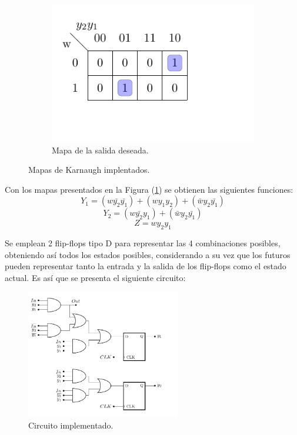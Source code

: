 \begin{figure}[H]
\begin{subfigure}{0.45\textwidth}
\end{subfigure}
\begin{subfigure}{0.5\textwidth}
	\centering
	\includegraphics[width=\textwidth, page=3]{ImagenesEjercicio2/Mapas-Kar.pdf}
	\caption{Mapa de la salida deseada.}
\end{subfigure}
	\caption{Mapas de Karnaugh implentados.}
	\label{fig:karnmealy}
\end{figure}

Con los mapas presentados en la Figura (\ref{fig:karnmealy}) se obtienen las siguientes funciones:
\begin{equation*}
	Y_1=(w\bar{y_2}\bar{y_1})+(wy_1y_2)+(\bar{w}y_2\bar{y_1})
\end{equation*}
\begin{equation*}
	Y_2=(w\bar{y_2}y_1)+(\bar{w}y_2\bar{y_1})
\end{equation*}
\begin{equation*}
	Z=wy_2y_1
\end{equation*}

Se emplean 2 flip-flops tipo D para representar las 4 combinaciones posibles, obteniendo así todos los estados posibles, considerando a su vez que los futuros pueden representar tanto la entrada y la salida de los flip-flops como el estado actual. Es así que se presenta el siguiente circuito:
\begin{figure}[H]
\centering
	\includegraphics[width=0.6\textwidth, page=1]{ImagenesEjercicio2/Circuitos2.pdf}
	\caption{Circuito implementado.}
\end{figure}

